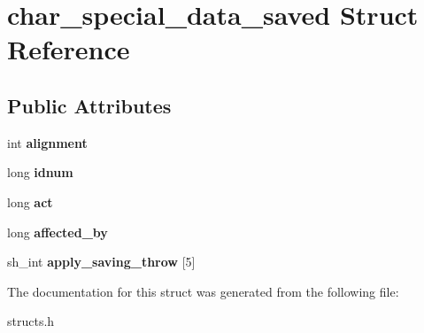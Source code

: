 \hypertarget{structchar__special__data__saved}{}\section{char\+\_\+special\+\_\+data\+\_\+saved Struct Reference}
\label{structchar__special__data__saved}
\subsection*{Public Attributes}
\begin{DoxyCompactItemize}
\item 
\mbox{\label{structchar__special__data__saved_a38b34cb9b7832347197392f7bdc00130}} 
int {\bfseries alignment}
\item 
\mbox{\label{structchar__special__data__saved_a497a75343823b24eee75c1800ba2909f}} 
long {\bfseries idnum}
\item 
\mbox{\label{structchar__special__data__saved_a8f8c3f8239b89a34347ddac456b345ae}} 
long {\bfseries act}
\item 
\mbox{\label{structchar__special__data__saved_a12d6d32b33d8f5e08a30867af62c7227}} 
long {\bfseries affected\+\_\+by}
\item 
\mbox{\label{structchar__special__data__saved_a798efe2138e4164ce7f2cfeb4748b5d2}} 
sh\+\_\+int {\bfseries apply\+\_\+saving\+\_\+throw} \mbox{[}5\mbox{]}
\end{DoxyCompactItemize}


The documentation for this struct was generated from the following file\+:\begin{DoxyCompactItemize}
\item 
structs.\+h\end{DoxyCompactItemize}
